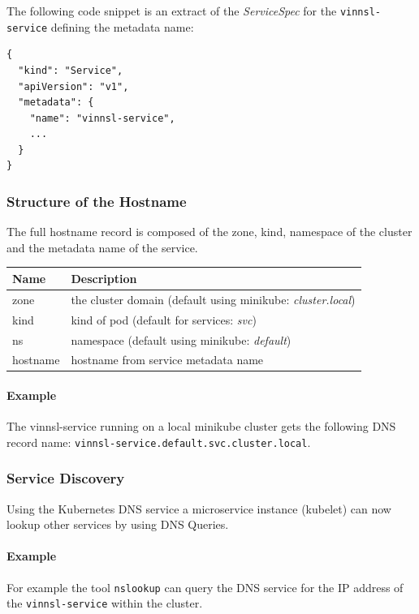 The following code snippet is an extract of the \emph{ServiceSpec} for
the \texttt{vinnsl-service} defining the metadata name:

\begin{verbatim}
{
  "kind": "Service",
  "apiVersion": "v1",
  "metadata": {
    "name": "vinnsl-service",
    ...
  }
}
\end{verbatim}

\subsubsection{Structure of the
Hostname}\label{structure-of-the-hostname}

The full hostname record is composed of the zone, kind, namespace of the
cluster and the metadata name of the service.

\begin{longtable}[]{@{}ll@{}}
\toprule
Name & Description\tabularnewline
\midrule
\endhead
zone & the cluster domain (default using minikube:
\emph{cluster.local})\tabularnewline
kind & kind of pod (default for services: \emph{svc})\tabularnewline
ns & namespace (default using minikube: \emph{default})\tabularnewline
hostname & hostname from service metadata name\tabularnewline
\bottomrule
\end{longtable}

\paragraph{Example}\label{example}

The vinnsl-service running on a local minikube cluster gets the
following DNS record name:
\texttt{vinnsl-service.default.svc.cluster.local}.

\subsubsection{Service Discovery}\label{service-discovery}

Using the Kubernetes DNS service a microservice instance (kubelet) can
now lookup other services by using DNS Queries.

\paragraph{Example}\label{example-1}

For example the tool \texttt{nslookup} can query the DNS service for the
IP address of the \texttt{vinnsl-service} within the cluster.

